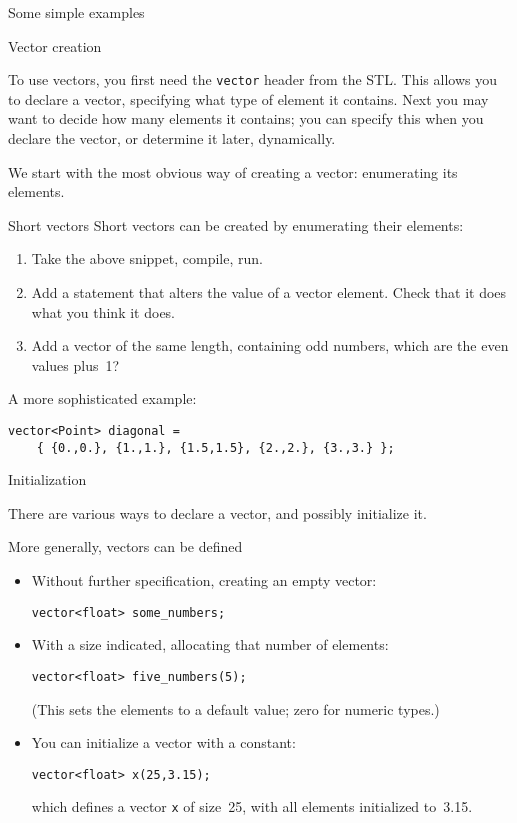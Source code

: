  {Some simple examples}

 {Vector creation}

To use vectors, you first need the \lstinline{vector} header from the \ac{STL}.
This allows you to declare a vector, specifying what type of element
it contains. Next you may want to decide how many elements it
contains; you can specify this when you declare the vector, or
determine it later, dynamically.

We start with the most obvious way of creating a vector:
enumerating its elements.

\begin{block}{Short vectors}
  \label{sl:vectorshort}
  Short vectors can be created by enumerating their elements:
  \lstset{style=snippetcode}
\end{block}

\begin{exercise}
  \label{ex:shortvectoralter}
  \begin{enumerate}
  \item
    Take the above snippet, compile, run.
  \item Add a statement that alters the value of a vector element.
    Check that it does what you think it does.
  \item Add a vector of the same length, containing odd numbers,
    which are the even values plus~1?
  \end{enumerate}
\end{exercise}

A more sophisticated example:
\begin{lstlisting}
vector<Point> diagonal = 
    { {0.,0.}, {1.,1.}, {1.5,1.5}, {2.,2.}, {3.,3.} };
\end{lstlisting}

 {Initialization}

There are various ways to declare a vector, and possibly initialize it.

More generally, vectors can be defined
\begin{itemize}
\item Without further specification, creating an empty vector:
\begin{lstlisting}
vector<float> some_numbers;
\end{lstlisting}
\item With a size indicated, allocating that number of elements:
\begin{lstlisting}
vector<float> five_numbers(5);
\end{lstlisting}
(This sets the elements to a default value; zero for numeric types.)
\item You can initialize a vector with a constant:
\begin{lstlisting}
vector<float> x(25,3.15);
\end{lstlisting}
which defines a vector \lstinline{x} of size~25,
with all elements initialized to~3.15.
\end{itemize}

